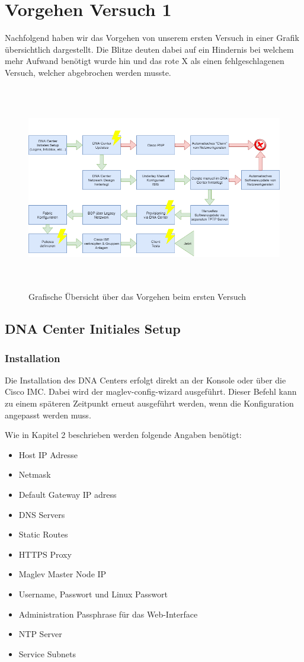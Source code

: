 \section{Vorgehen Versuch 1}
Nachfolgend haben wir das Vorgehen von unserem ersten Versuch in einer Grafik übersichtlich dargestellt. Die Blitze deuten dabei auf ein Hindernis bei welchem mehr Aufwand benötigt wurde hin und das rote X als einen fehlgeschlagenen Versuch, welcher abgebrochen werden musste.
\begin{figure}[H]
	\centering
	\includegraphics[height=9cm]{img/vorgehen.png}
	\caption{Grafische Übersicht über das Vorgehen beim ersten Versuch}
	\label{fig:vorgehen}
\end{figure} 

\subsection{DNA Center Initiales Setup}

\subsubsection{Installation}
\label{DNACenterSetup_Installation}
Die Installation des DNA Centers erfolgt direkt an der Konsole oder über die Cisco IMC. Dabei wird der maglev-config-wizard ausgeführt. Dieser Befehl kann zu einem späteren Zeitpunkt erneut ausgeführt werden, wenn die Konfiguration angepasst werden muss.

Wie in Kapitel 2\cite{cisco-dna-installation-guide} beschrieben werden folgende Angaben benötigt:
\begin{itemize}
	\item Host IP Adresse
	\item Netmask
	\item Default Gateway IP adress
	\item DNS Servers
	\item Static Routes
	\item HTTPS Proxy
	\item Maglev Master Node IP
	\item Username, Passwort und Linux Passwort
	\item Administration Passphrase für das Web-Interface
	\item NTP Server
	\item Service Subnets
\end{itemize}

